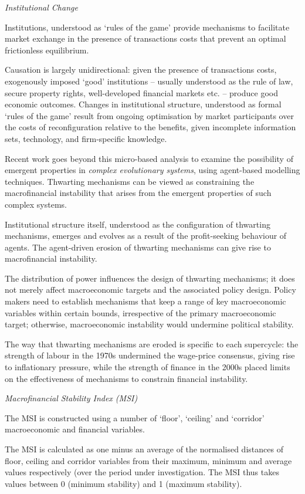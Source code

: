 \documentclass[
]{book}
\begin{document}
\emph{Institutional Change}

Institutions, understood as `rules of the game' provide mechanisms to facilitate
market exchange in the presence of transactions costs that
prevent an optimal frictionless equilibrium.

Causation is largely unidirectional: given the presence of transactions costs,
exogenously imposed `good' institutions --
usually understood as the rule of law, secure property rights, well-developed
financial markets etc. -- produce good economic outcomes.
Changes in institutional structure, understood as formal `rules of the game'
result from ongoing optimisation by market participants
over the costs of reconfiguration relative to the benefits,
given incomplete information sets, technology, and firm-specific knowledge.

Recent work goes beyond this micro-based analysis to examine the possibility of emergent properties
in \emph{complex evolutionary systems}, using agent-based modelling techniques.
Thwarting mechanisms can be viewed as constraining the macrofinancial instability that arises
from the emergent properties of such complex systems.

Institutional structure itself, understood as the configuration of thwarting mechanisms,
emerges and evolves as a result of the profit-seeking behaviour of agents.
The agent-driven erosion of thwarting mechanisms can give rise to
macrofinancial instability.

The distribution of power influences the
design of thwarting mechanisms; it does not merely affect macroeconomic targets and the associated
policy design. Policy makers need to establish mechanisms that keep a range of key macroeconomic
variables within certain bounds, irrespective of the primary macroeconomic target; otherwise,
macroeconomic instability would undermine political stability.

The way that thwarting mechanisms are eroded is specific to each supercycle:
the strength of labour in the 1970s undermined the wage-price consensus,
giving rise to inflationary pressure,
while the strength of finance in the 2000s placed limits on
the effectiveness of mechanisms to constrain financial instability.

\emph{Macrofinancial Stability Index (MSI)}

The MSI is constructed using a number of `floor', `ceiling' and `corridor'
macroeconomic and financial variables.

The MSI is calculated as one minus
an average of the normalised distances of floor, ceiling and corridor
variables from their maximum, minimum and average values respectively (over the period under
investigation.
The MSI thus takes values between 0 (minimum stability) and 1 (maximum stability).
\end{document}
